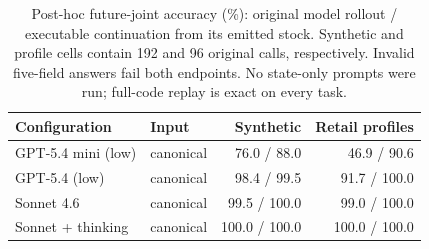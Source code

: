 \begin{table}[htbp]
\centering\small
\begin{tabular}{llrr}
\toprule
Configuration & Input & Synthetic & Retail profiles \\
\midrule
GPT-5.4 mini (low) & canonical & 76.0 / 88.0 & 46.9 / 90.6 \\
GPT-5.4 (low) & canonical & 98.4 / 99.5 & 91.7 / 100.0 \\
Sonnet 4.6 & canonical & 99.5 / 100.0 & 99.0 / 100.0 \\
Sonnet + thinking & canonical & 100.0 / 100.0 & 100.0 / 100.0 \\
\bottomrule
\end{tabular}
\caption{Post-hoc future-joint accuracy (\%): original model rollout / executable continuation from its emitted stock. Synthetic and profile cells contain 192 and 96 original calls, respectively. Invalid five-field answers fail both endpoints. No state-only prompts were run; full-code replay is exact on every task.}
\label{tab:continuation}
\end{table}
